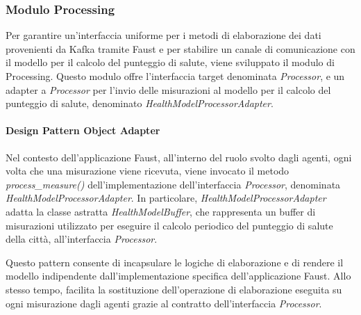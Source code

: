 \subsubsection{Modulo Processing}
Per garantire un'interfaccia uniforme per i metodi di elaborazione dei dati provenienti da Kafka tramite Faust e per stabilire un canale di comunicazione con il modello per il calcolo del punteggio di salute, viene sviluppato il modulo di Processing. Questo modulo offre l'interfaccia target denominata \textit{Processor}, e un adapter a \textit{Processor} per l'invio delle misurazioni al modello per il calcolo del punteggio di salute, denominato \textit{HealthModelProcessorAdapter}.

\paragraph*{Design Pattern Object Adapter}
Nel contesto dell'applicazione Faust, all'interno del ruolo svolto dagli agenti, ogni volta che una misurazione viene ricevuta, viene invocato il metodo \textit{process\_measure()} dell'implementazione dell'interfaccia \textit{Processor}, denominata \textit{HealthModelProcessorAdapter}. In particolare, \textit{HealthModelProcessorAdapter} adatta la classe astratta \textit{HealthModelBuffer}, che rappresenta un buffer di misurazioni utilizzato per eseguire il calcolo periodico del punteggio di salute della città, all'interfaccia \textit{Processor}.

Questo pattern consente di incapsulare le logiche di elaborazione e di rendere il modello indipendente dall'implementazione specifica dell'applicazione Faust. Allo stesso tempo, facilita la sostituzione dell'operazione di elaborazione eseguita su ogni misurazione dagli agenti grazie al contratto dell'interfaccia \textit{Processor}.
